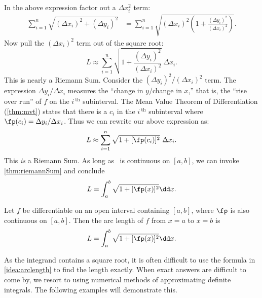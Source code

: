 In the above expression factor out a $\Delta x_i^2$ term:
\begin{align*}
	\sum_{i=1}^n \sqrt{(\Delta x_i)^2 + (\Delta y_i)^2}
	&= \sum_{i=1}^n \sqrt{(\Delta x_i)^2\left(1 + \frac{(\Delta y_i)^2}{(\Delta x_i)^2}\right)}.
\end{align*}
Now pull the $(\Delta x_i)^2$ term out of the square root:
\[L\approx\sum_{i=1}^n\sqrt{1 + \frac{(\Delta y_i)^2}{(\Delta x_i)^2}}\ \Delta x_i.\]
This is nearly a Riemann Sum. Consider the $(\Delta y_i)^2/(\Delta x_i)^2$ term. The expression $\Delta y_i/\Delta x_i$ measures the ``change in $y$/change in $x$,'' that is, the ``rise over run'' of $f$ on the $i\,^\text{th}$ subinterval. The Mean Value Theorem of Differentiation (\autoref{thm:mvt}) states that there is a $c_i$ in the $i\,^\text{th}$ subinterval where $\fp(c_i) = \Delta y_i/\Delta x_i$. Thus we can rewrite our above expression as:
\[L\approx\sum_{i=1}^n\sqrt{1+[\fp(c_i)]^2}\ \Delta x_i.\]
This \emph{is} a Riemann Sum. As long as \fp\ is continuous on $[a,b]$, we can invoke \autoref{thm:riemannSum} and conclude
\[L=\int_a^b\sqrt{1+[\fp(x)]^2}\dd x.\]

\begin{keyidea}\label{idea:arclength}
Let $f$ be differentiable on an open interval containing $[a,b]$, where $\fp$ is also continuous on $[a,b]$. Then the arc length of $f$ from $x=a$ to $x=b$ is
\[L = \int_a^b \sqrt{1+[\fp(x)]^2}\dd x.\]
\end{keyidea}


As the integrand contains a square root, it is often difficult to use the formula in \autoref{idea:arclength} to find the length exactly. When exact answers are difficult to come by, we resort to using numerical methods of approximating definite integrals. The following examples will demonstrate this.


